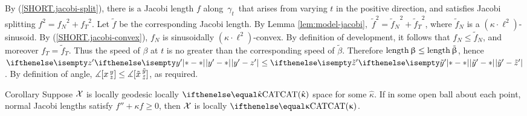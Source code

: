 By (\ref{SHORT.jacobi-split}), there is a Jacobi length $f$ along \,$\gamma_t$\, 
that arises from varying $t$ in the positive direction, and satisfies Jacobi splitting $f^2 = {f_N}^2 + {f_T}^2$.  Let $\tilde f$ be the corresponding Jacobi length.  By Lemma \ref{lem:model-jacobi}, \,$\tilde f^2 = {\tilde f_N}^2 + {\tilde f_T}^2$, where $\tilde f_N$ is a  $(\kappa\cdot\ell^2)$-sinusoid. By (\ref{SHORT.jacobi-convex}), $f_N$ is sinusoidally $(\kappa\cdot\ell^2)$-convex. By definition of development, it follows that $f_N\le\tilde f_N$, and moreover $f_T=\tilde f_T$.  Thus the speed of $\beta$ at $t$  is no greater than the corresponding speed of $\tilde \beta$.   Therefore $\length \beta\le\length\tilde \beta$, hence $\dist{y^\prime}{z^\prime}{}\le \dist{\tilde y^\prime}{\tilde z^\prime}{}$.  By definition of angle, $\mangle\hinge {x}{y}
{z}\le\mangle\hinge {\tilde x}{\tilde y}{\tilde z}$, as required.\qeds

\begin{thm}{Corollary}
Suppose  $\mathcal{X}$ is locally geodesic locally $\CAT{\hat\kappa}$ space for some $\hat\kappa$.
If in some open ball about each point, normal Jacobi lengths satisfy $f''+\kappa f\ge 0$, then $\mathcal{X}$ is locally $\CAT\kappa$.
\end{thm}

